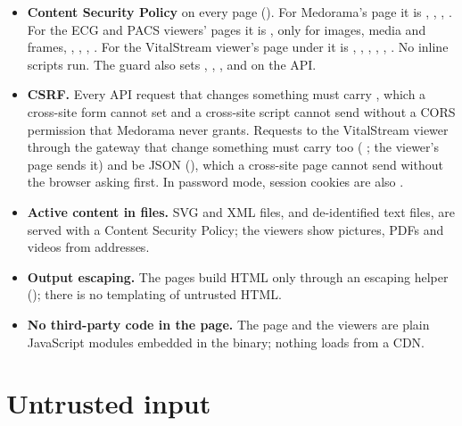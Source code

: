 \begin{itemize}
\item \textbf{Content Security Policy} on every page (). For Medorama's page it is
  , , ,
  . For the ECG and PACS viewers' pages it is ,
   only for images, media and frames, ,
  , , . For the
  VitalStream viewer's page under  it is ,
  , , ,
  , . No inline
  scripts run. The guard also sets , ,
  , and  on the API.
\item \textbf{CSRF.} Every API request that changes something must carry ,
  which a cross-site form cannot set and a cross-site script cannot send without a CORS
  permission that Medorama never grants. Requests to the VitalStream viewer through the gateway
  that change something must carry  too ( ; the
  viewer's page sends it) and be JSON (), which a cross-site
  page cannot send without the browser asking first. In password mode, session cookies are also
  .
\item \textbf{Active content in files.} SVG and XML files, and de-identified text files, are
  served with a  Content Security Policy; the viewers show pictures, PDFs and videos
  from  addresses.
\item \textbf{Output escaping.} The pages build HTML only through an escaping helper
  (); there is no templating of untrusted HTML.
\item \textbf{No third-party code in the page.} The page and the viewers are plain JavaScript
  modules embedded in the binary; nothing loads from a CDN.
\end{itemize}

\section{Untrusted input}
\label{sec:security-input}

